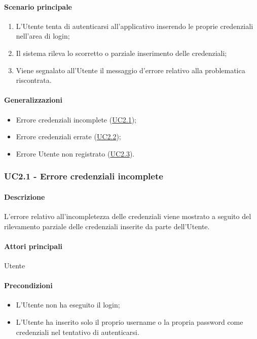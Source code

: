 \paragraph*{Scenario principale}
\begin{enumerate}
  \item L’Utente tenta di autenticarsi all’applicativo inserendo le proprie credenziali nell’area di login;
  \item Il sistema rileva lo scorretto o parziale inserimento delle credenziali;
  \item Viene segnalato all’Utente il messaggio d’errore relativo alla problematica riscontrata.  
\end{enumerate}

\paragraph*{Generalizzazioni}
\begin{itemize}
  \item Errore credenziali incomplete (\hyperref[UC2point1]{UC2.1});
  \item Errore credenziali errate (\hyperref[UC2point2]{UC2.2});
  \item Errore Utente non registrato (\hyperref[UC2point3]{UC2.3}).
\end{itemize}


\subsubsection{UC2.1 - Errore credenziali incomplete}\label{UC2point1}
\paragraph*{Descrizione}
L’errore relativo all’incompletezza delle credenziali viene mostrato a seguito del rilevamento parziale delle credenziali inserite da parte dell’Utente.

\paragraph*{Attori principali}
Utente

\paragraph*{Precondizioni}
\begin{itemize}
  \item L’Utente non ha eseguito il login;
  \item L’Utente ha inserito solo il proprio username o la propria password come credenziali nel tentativo di autenticarsi.  
\end{itemize}

